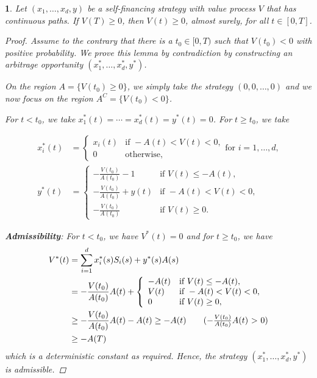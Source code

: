 \documentclass[english]{article}
\numberwithin{equation}{section}
\numberwithin{figure}{section}
\theoremstyle{bolddescit}
\theoremstyle{definition}
\theoremstyle{definition}
\theoremstyle{plain}
\newtheorem{lemma}[theorem]{\protect\lemmaname}
\theoremstyle{plain}
\theoremstyle{bolddesc}
\theoremstyle{plain}
\theoremstyle{remark}
\providecommand{\lemmaname}{Lemma}
\begin{document}
\begin{lemma}\label{lem:bs-non-negative-strat}
  Let $(x_1, \ldots, x_d, y)$ be a self-financing strategy with value process $V$ that has continuous paths. If $V(T) \ge 0$, then $V(t) \ge 0$, almost surely, for all $t \in [0,T]$.

  \begin{proof}
    Assume to the contrary that there is a $t_0 \in [0,T)$ such that $V(t_0) < 0$ with positive probability. We prove this lemma by contradiction by constructing an arbitrage opportunity $(x_1^*, \ldots, x_d^*, y^*)$.

    On the region $A = \{V(t_0) \ge 0\}$, we simply take the strategy $(0,0,\ldots,0)$ and we now focus on the region $A^C = \{V(t_0) < 0\}$.

    For $t < t_0$, we take $x_1^*(t) = \cdots = x_d^*(t) = y^*(t) = 0$. For $t \ge t_0$, we take

    \begin{align*}
      x_i^*(t) &= \left\{ \begin{array}{ll}
        x_i(t) & \text{if } -A(t) < V(t) < 0,\\
        0 & \text{otherwise},
      \end{array}\right. \text{for } i=1,\ldots,d,\\
      y^*(t) &= \left\{ \begin{array}{ll}
        - \frac{V(t_0)}{A(t_0)} - 1 & \text{if } V(t) \le - A(t),\\
        - \frac{V(t_0)}{A(t_0)} + y(t) & \text{if } -A(t) < V(t) < 0,\\
        - \frac{V(t_0)}{A(t_0)} & \text{if } V(t) \ge 0.
      \end{array}\right.
    \end{align*}

    \textbf{Admissibility}: For $t < t_0$, we have $V^*(t) = 0$ and for $t \ge t_0$, we have
      \begin{align*}
        V^*(t)
        &= \sum_{i=1}^d x_i^*(s) S_i(s) + y^*(s) A(s)\\
        &= -\frac{V(t_0)}{A(t_0)} A(t) + \left\{
          \begin{array}{ll}
            -A(t) & \text{if } V(t) \le -A(t),\\
            V(t) & \text{if } -A(t) < V(t) < 0,\\
            0 & \text{if } V(t) \ge 0,
          \end{array}
        \right.\\
        &\ge -\frac{V(t_0)}{A(t_0)} A(t) - A(t)
        \ge - A(t) \tag{$-\frac{V(t_0)}{A(t_0)}A(t)$ > 0}\\
        &\ge -  A(T)
      \end{align*}
      which is a deterministic constant as required. Hence, the strategy $(x^*_1,\ldots,x^*_d,y^*)$ is admissible.


\end{proof}
\end{lemma}
\end{document}
